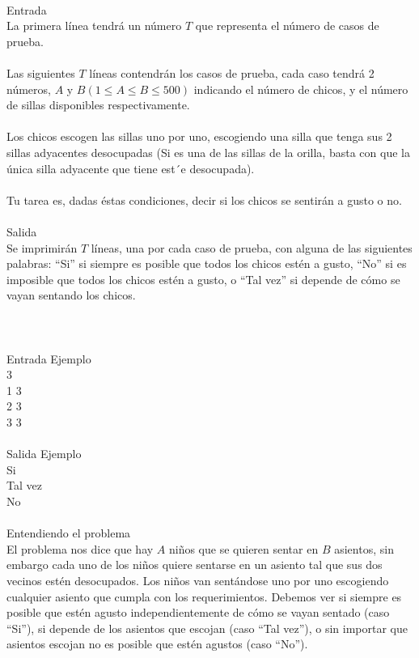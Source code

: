\documentclass[12pt]{article}
\begin{document}
\\
\textrm{\large Entrada}
\\
La primera línea tendrá un número $T$ que representa el número de casos de prueba.\\
\\Las siguientes $T$ líneas contendrán los casos de prueba, cada caso tendrá 2 números, $A$ y $B (1 ≤ A ≤ B ≤ 500)$ indicando el número de chicos, y el número de sillas disponibles respectivamente.\\
\\Los chicos escogen las sillas uno por uno, escogiendo una silla que tenga sus 2 sillas adyacentes desocupadas (Si es una de las sillas de la orilla, basta con que la única silla adyacente que tiene est´e desocupada).\\
\\Tu tarea es, dadas éstas condiciones, decir si los chicos se sentirán a gusto o no.
\\
\\
\textrm{\large Salida}
\\
Se imprimirán $T$ líneas, una por cada caso de prueba, con alguna de las siguientes palabras: “Si” si siempre es posible que todos los chicos estén a gusto, “No” si es imposible que todos los chicos estén a gusto, o “Tal vez” si depende de cómo se vayan sentando los chicos.\\
\\
\\
\\
\textrm{\large Entrada Ejemplo}
\\
3\\
1 3\\
2 3\\
3 3\\
\\
\textrm{\large Salida Ejemplo}
\\
Si\\
Tal vez\\
No\\
\\
\textrm{\large Entendiendo el problema}\\
El problema nos dice que hay $A$ niños que se quieren sentar en $B$ asientos, sin embargo cada uno de los niños quiere sentarse en un asiento tal que sus dos vecinos estén desocupados. Los niños van sentándose uno por uno escogiendo cualquier asiento que cumpla con los requerimientos. Debemos ver si siempre es posible que estén agusto independientemente de cómo se vayan sentado (caso ``Si''), si depende de los asientos que escojan (caso ``Tal vez''), o sin importar que asientos escojan no es posible que estén agustos (caso ``No'').\\ 
\end{document}
